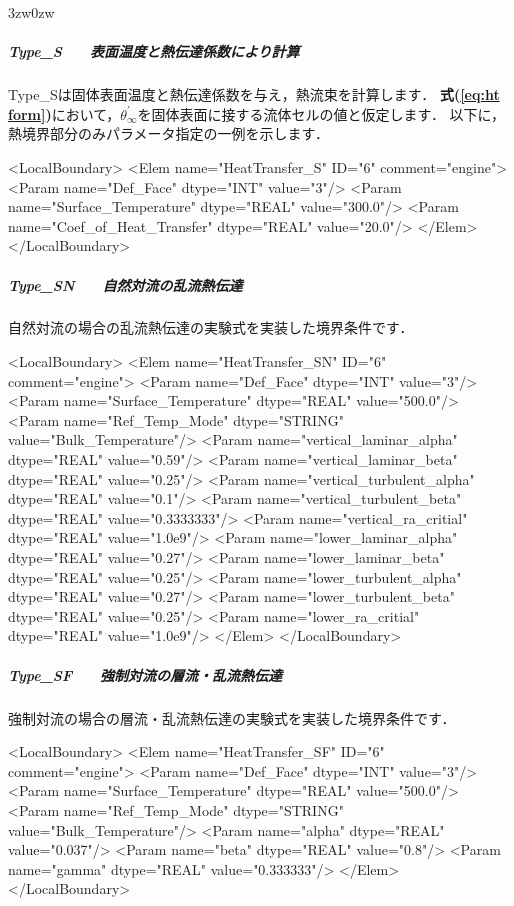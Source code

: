 \begin{indentation}{3zw}{0zw}
%
\subparagraph{Type\_S　　表面温度と熱伝達係数により計算}
Type\_Sは固体表面温度と熱伝達係数を与え，熱流束を計算します．
\textbf{式(\ref{eq:ht form})}において，$\theta_{\infty}^{\prime}$を固体表面に接する流体セルの値と仮定します．
以下に，熱境界部分のみパラメータ指定の一例を示します．

{\small
\begin{program}
<LocalBoundary>
  <Elem name="HeatTransfer_S" ID="6" comment="engine">
    <Param name="Def_Face"              dtype="INT"  value="3"/>
    <Param name="Surface_Temperature"   dtype="REAL" value="300.0"/>
    <Param name="Coef_of_Heat_Transfer" dtype="REAL" value="20.0"/>
  </Elem>
</LocalBoundary>
\end{program}
}

%
\subparagraph{Type\_SN　　自然対流の乱流熱伝達}
自然対流の場合の乱流熱伝達の実験式を実装した境界条件です．

{\small
\begin{program}
<LocalBoundary>
  <Elem name="HeatTransfer_SN" ID="6" comment="engine">
    <Param name="Def_Face"                 dtype="INT"    value="3"/>
    <Param name="Surface_Temperature"      dtype="REAL"   value="500.0"/>
    <Param name="Ref_Temp_Mode"            dtype="STRING" value="Bulk_Temperature"/>
    <Param name="vertical_laminar_alpha"   dtype="REAL"   value="0.59"/>
    <Param name="vertical_laminar_beta"    dtype="REAL"   value="0.25"/>
    <Param name="vertical_turbulent_alpha" dtype="REAL"   value="0.1"/>
    <Param name="vertical_turbulent_beta"  dtype="REAL"   value="0.3333333"/>
    <Param name="vertical_ra_critial"      dtype="REAL"   value="1.0e9"/>
    <Param name="lower_laminar_alpha"      dtype="REAL"   value="0.27"/>
    <Param name="lower_laminar_beta"       dtype="REAL"   value="0.25"/>
    <Param name="lower_turbulent_alpha"    dtype="REAL"   value="0.27"/>
    <Param name="lower_turbulent_beta"     dtype="REAL"   value="0.25"/>
    <Param name="lower_ra_critial"         dtype="REAL"   value="1.0e9"/>
  </Elem>
</LocalBoundary>
\end{program}
}

%
\subparagraph{Type\_SF　　強制対流の層流・乱流熱伝達}
強制対流の場合の層流・乱流熱伝達の実験式を実装した境界条件です．

{\small
\begin{program}
<LocalBoundary>
  <Elem name="HeatTransfer_SF" ID="6" comment="engine">
    <Param name="Def_Face"            dtype="INT"    value="3"/>
    <Param name="Surface_Temperature" dtype="REAL"   value="500.0"/>
    <Param name="Ref_Temp_Mode"       dtype="STRING" value="Bulk_Temperature"/>
    <Param name="alpha"               dtype="REAL"   value="0.037"/>
    <Param name="beta"                dtype="REAL"   value="0.8"/>
    <Param name="gamma"               dtype="REAL"   value="0.333333"/>
  </Elem>
</LocalBoundary>
\end{program}
}


\end{indentation}
